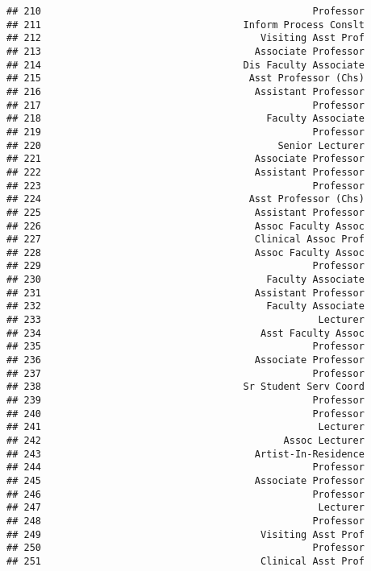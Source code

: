 \documentclass[
]{article}
\begin{document}
\begin{verbatim}
## 210                                               Professor
## 211                                   Inform Process Conslt
## 212                                      Visiting Asst Prof
## 213                                     Associate Professor
## 214                                   Dis Faculty Associate
## 215                                    Asst Professor (Chs)
## 216                                     Assistant Professor
## 217                                               Professor
## 218                                       Faculty Associate
## 219                                               Professor
## 220                                         Senior Lecturer
## 221                                     Associate Professor
## 222                                     Assistant Professor
## 223                                               Professor
## 224                                    Asst Professor (Chs)
## 225                                     Assistant Professor
## 226                                     Assoc Faculty Assoc
## 227                                     Clinical Assoc Prof
## 228                                     Assoc Faculty Assoc
## 229                                               Professor
## 230                                       Faculty Associate
## 231                                     Assistant Professor
## 232                                       Faculty Associate
## 233                                                Lecturer
## 234                                      Asst Faculty Assoc
## 235                                               Professor
## 236                                     Associate Professor
## 237                                               Professor
## 238                                   Sr Student Serv Coord
## 239                                               Professor
## 240                                               Professor
## 241                                                Lecturer
## 242                                          Assoc Lecturer
## 243                                     Artist-In-Residence
## 244                                               Professor
## 245                                     Associate Professor
## 246                                               Professor
## 247                                                Lecturer
## 248                                               Professor
## 249                                      Visiting Asst Prof
## 250                                               Professor
## 251                                      Clinical Asst Prof

\end{verbatim}
\end{document}
